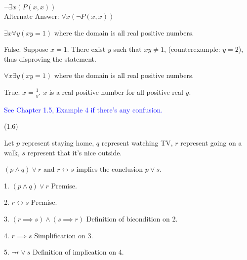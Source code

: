 \documentclass{exam}
\begin{document}
\begin{questions}
\begin{subparts}
\begin{center}
\( \neg \exists x (P(x, x)) \)
\\Alternate Answer: \( \forall x (\neg P(x, x)) \)
\end{center}

\end{subparts}

\begin{subparts}
\subpart \( \exists x \forall y (xy = 1) \) where the domain is all real positive numbers.

\begin{center}
False. Suppose \(x = 1\). There exist \(y\) such that \(xy \neq 1\), (counterexample: \(y = 2\)), thus disproving the statement.
\end{center}

\subpart \( \forall x \exists y (xy = 1) \) where the domain is all real positive numbers.

\begin{center}
True. \(x = \frac{1}{y}\). \(x\) is a real positive number for all positive real \(y\).

\vspace{5px} \textcolor{blue}{See Chapter 1.5, Example 4 if there's any confusion.}
\end{center}

\end{subparts}

\newpage

 (1.6)

\begin{center}
Let \(p\) represent staying home, \(q\) represent watching TV, \(r\) represent going on a walk, \(s\) represent that it's nice outside.

\( (p \land q) \lor r\) and \( r \longleftrightarrow s\) implies the conclusion \(p \lor s\).

1. \( (p \land q) \lor r\) Premise.

2. \( r \longleftrightarrow s\) Premise.

3. \( (r \implies s) \land (s \implies r)  \) Definition of bicondition on 2.

4. \( r \implies s \) Simplification on 3.

5. \( \neg r \lor s \) Definition of implication on 4.


\end{center}
\end{questions}
\end{document}
